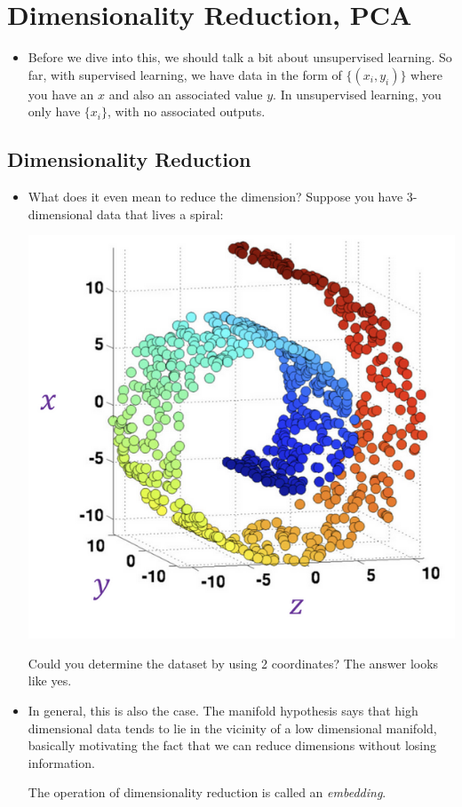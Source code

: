 \section{Dimensionality Reduction, PCA}
\begin{itemize}
	\item Before we dive into this, we should talk a bit about unsupervised learning.
		So far, with supervised learning, we have data in the form of \( \{(x_i,
		y_i)\} \) where you have an \( x \) and also an associated value \( y \). In
		unsupervised learning, you only have \( \{x_i\} \), with no associated
		outputs.
\end{itemize}

\subsection{Dimensionality Reduction}
\begin{itemize}
	\item What does it even mean to reduce the dimension? Suppose you have
		3-dimensional data that lives a spiral:
		\begin{center}
			\includegraphics[scale=0.5]{images/lec12-1.png}
		\end{center}
		Could you determine the dataset by using 2 coordinates? The answer looks like
		yes. 
	\item In general, this is also the case. The manifold hypothesis says that high
		dimensional data tends to lie in the vicinity of a low dimensional manifold,
		basically motivating the fact that we can reduce dimensions without losing
		information. 


		The operation of dimensionality reduction is called an \textit{embedding}.  
\end{itemize}

